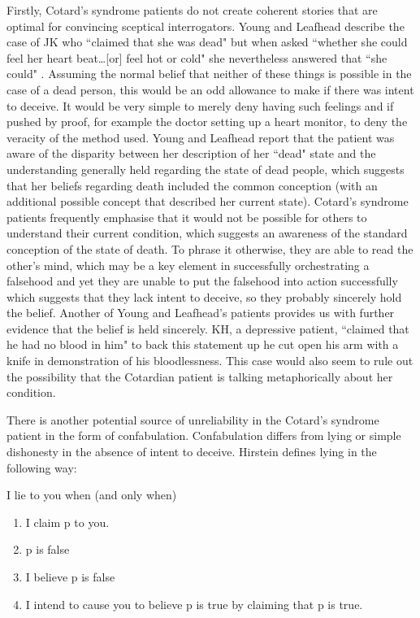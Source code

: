 Firstly, Cotard's syndrome patients do not create coherent stories that are optimal for convincing sceptical interrogators. Young and Leafhead describe the case of JK who ``claimed that she was dead" \cite[p. 157]{young1995} but when asked ``whether she could feel her heart beat\ldots[or] feel hot or cold" she nevertheless answered that ``she could" \cite[p. 157]{young1995}. Assuming the normal belief that neither of these things is possible in the case of a dead person, this would be an odd allowance to make if there was intent to deceive. It would be very simple to merely deny having such feelings and if pushed by proof, for example the doctor setting up a heart monitor, to deny the veracity of the method used. Young and Leafhead report that the patient was aware of the disparity between her description of her ``dead" state and the understanding generally held regarding the state of dead people, which suggests that her beliefs regarding death included the common conception (with an additional possible concept that described her current state). Cotard's syndrome patients frequently emphasise that it would not be possible for others to understand their current condition, which suggests an awareness of the standard conception of the state of death. To phrase it otherwise, they are able to read the other's mind, which may be a key element in successfully orchestrating a falsehood \cite[p. 101]{hirstein2005} and yet they are unable to put the falsehood into action successfully which suggests that they lack intent to deceive, so they probably sincerely hold the belief. Another of Young and Leafhead's patients provides us with further evidence that the belief is held sincerely. KH, a depressive patient, ``claimed that he had no blood in him" \cite[p. 160]{young1995} to back this statement up he cut open his arm with a knife in demonstration of his bloodlessness. This case would also seem to rule out the possibility that the Cotardian patient is talking metaphorically about her condition.

There is another potential source of unreliability in the Cotard's syndrome patient in the form of confabulation. Confabulation differs from lying or simple dishonesty in the absence of intent to deceive. Hirstein \cite[p. 16]{hirstein2005} defines lying in the following way:

\begin{displayquote}
I lie to you when (and only when) \begin{enumerate}
    \item I claim p to you.
    \item p is false
    \item I believe p is false
    \item I intend to cause you to believe p is true by claiming that p is true.
\end{enumerate}
\end{displayquote}

